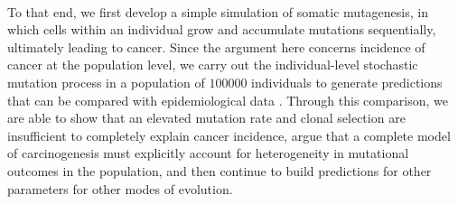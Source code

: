 \documentclass[12pt, onecolumn]{article}
\begin{document}
	\paragraph{\empty}To that end, we first develop a simple simulation of somatic mutagenesis, in which cells within an individual grow and accumulate mutations sequentially, ultimately leading to cancer. Since the argument here concerns incidence of cancer at the population level, we carry out the individual-level stochastic mutation process in a population of $100000$ individuals to generate predictions that can be compared with epidemiological data \cite{AmericanCancerSociety2016}. Through this comparison, we are able to show that an elevated mutation rate and clonal selection are insufficient to completely explain cancer incidence, argue that a complete model of carcinogenesis must explicitly account for heterogeneity in mutational outcomes in the population, and then continue to build predictions for other parameters for other modes of evolution.
\end{document}
